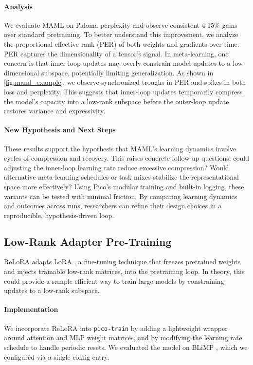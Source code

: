 \paragraph{Analysis} We evaluate MAML on Paloma perplexity and observe consistent 4-15\% gains over standard pretraining. To better understand this improvement, we analyze the proportional effective rank (PER) \citep{diehlmartinez2024tending} of both weights and gradients over time. PER captures the dimensionality of a tensor's signal. In meta-learning, one concern is that inner-loop updates may overly constrain model updates to a low-dimensional subspace, potentially limiting generalization. As shown in \cref{fig:maml_example}, we observe synchronized troughs in PER and spikes in both loss and perplexity. This suggests that inner-loop updates temporarily compress the model's capacity into a low-rank subspace before the outer-loop update restores variance and expressivity.


\paragraph{New Hypothesis and Next Steps}
These results support the hypothesis that MAML's learning dynamics involve cycles of compression and recovery. This raises concrete follow-up questions: could adjusting the inner-loop learning rate reduce excessive compression? Would alternative meta-learning schedules or task mixes stabilize the representational space more effectively? Using Pico's modular training and built-in logging, these variants can be tested with minimal friction. By comparing learning dynamics and outcomes across runs, researchers can refine their design choices in a reproducible, hypothesis-driven loop.%


\subsection{Low-Rank Adapter Pre-Training}

ReLoRA \citep{lialin2023relora} adapts LoRA \citep{hu2021lora}, a fine-tuning technique that freezes pretrained weights and injects trainable low-rank matrices, into the pretraining loop. In theory, this could provide a sample-efficient way to train large models by constraining updates to a low-rank subspace. %

\paragraph{Implementation} We incorporate ReLoRA into \texttt{pico-train} by adding a lightweight wrapper around attention and MLP weight matrices, and by modifying the learning rate schedule to handle periodic resets. We evaluated the model on BLiMP \citep{warstadt2020blimp}, which we configured via a single config entry. %

